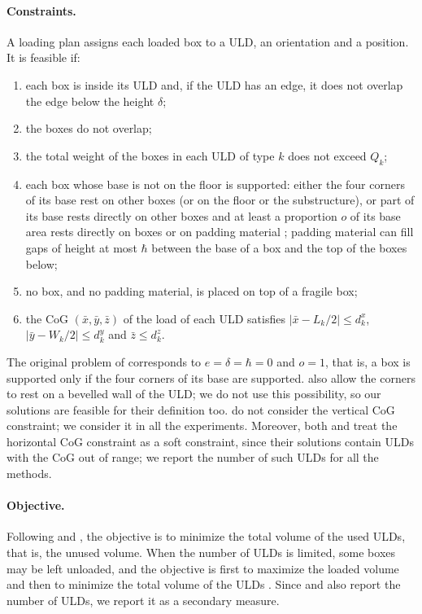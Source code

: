 \paragraph{Constraints.}
A loading plan assigns each loaded box to a ULD, an orientation and a position. It is feasible
if:
\begin{enumerate}
\item each box is inside its ULD and, if the ULD has an edge, it does not overlap the edge
	below the height $\delta$;
\item the boxes do not overlap;
\item the total weight of the boxes in each ULD of type $k$ does not exceed $Q_k$;
\item each box whose base is not on the floor is supported: either the four corners of its base
	rest on other boxes (or on the floor or the substructure), or part of its base rests directly
	on other boxes and at least a proportion $o$ of its base area rests directly on boxes or on
	padding material \citep{Hessler2025}; padding material can fill gaps of height at most
	$\hbar$ between the base of a box and the top of the boxes below;
\item no box, and no padding material, is placed on top of a fragile box;
\item the CoG $(\bar x, \bar y, \bar z)$ of the load of each ULD satisfies
	$|\bar x - L_k/2| \le d^x_k$, $|\bar y - W_k/2| \le d^y_k$ and $\bar z \le d^z_k$.
\end{enumerate}
The original problem of \citet{Paquay2016} corresponds to $e = \delta = \hbar = 0$ and $o = 1$,
that is, a box is supported only if the four corners of its base are supported.
\citet{Paquay2018b} also allow the corners to rest on a bevelled wall of the ULD; we do not use
this possibility, so our solutions are feasible for their definition too.
\citet{Hessler2025} do not consider the vertical CoG constraint; we consider it in all the
experiments. Moreover, both \citet{Paquay2018b} and \citet{Hessler2025} treat the horizontal
CoG constraint as a soft constraint, since their solutions contain ULDs with the CoG out of
range; we report the number of such ULDs for all the methods.

\paragraph{Objective.}
Following \citet{Paquay2016} and \citet{Hessler2025}, the objective is to minimize the total
volume of the used ULDs, that is, the unused volume. When the number of ULDs is limited, some
boxes may be left unloaded, and the objective is first to maximize the loaded volume and then to
minimize the total volume of the ULDs \citep{Hessler2025}. Since \citet{Paquay2018b} and
\citet{Hessler2025} also report the number of ULDs, we report it as a secondary measure.
